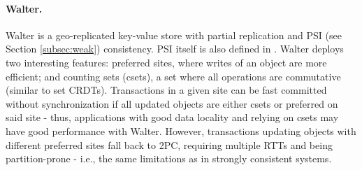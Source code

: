 
\paragraph{Walter.} Walter \cite{walter} is a geo-replicated key-value store with partial replication and PSI (see Section \ref{subsec:weak}) consistency.
PSI itself is also defined in \cite{walter}.
Walter deploys two interesting features: preferred sites, where writes of an object are more efficient; and counting sets (csets), a set where all operations are commutative (similar to set CRDTs).
Transactions in a given site can be fast committed without synchronization if all updated objects are either csets or preferred on said site - thus, applications with good data locality and relying on csets may have good performance with Walter.
However, transactions updating objects with different preferred sites fall back to 2PC, requiring multiple RTTs and being partition-prone - i.e., the same limitations as in strongly consistent systems.


%

